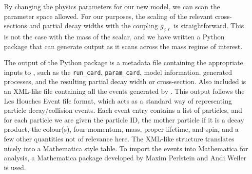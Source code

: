 By changing the physics parameters for our new model, we can scan the parameter space allowed.
For our purposes, the scaling of the relevant cross-sections and partial decay widths with the coupling $g_{\phi\ell}$ is straightforward.
This is not the case with the mass of the scalar, and we have written a Python package that can generate \madgraph output as it scans across the mass regime of interest.

The output of the Python package is a metadata file containing the appropriate inputs to \madgraph, such as the \texttt{run\_card}, \texttt{param\_card}, model information, generated processes, and the resulting partial decay width or cross-section.
Also included is an XML-like file containing all the events generated by \madgraph.
This output follows the Les Houches Event file format\cite{Alwall:2006yp}, which acts as a standard way of representing particle decay/collision events.
Each event entry contains a list of particles, and for each particle we are given the particle ID, the mother particle if it is a decay product, the colour(s), four-momentum, mass, proper lifetime, and spin, and a few other quantities not of relevance here.
The XML-like structure translates nicely into a Mathematica style table.
To import the events into Mathematica for analysis, a Mathematica package developed by Maxim Perlstein and Andi Weiler is used.
